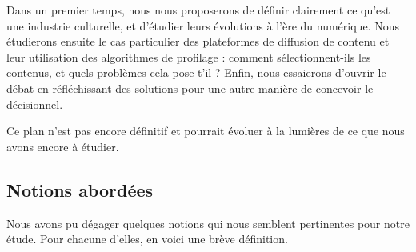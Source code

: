 \documentclass[a4paper,10pt]{article}
\begin{document}
Dans un premier temps, nous nous proposerons de définir clairement ce qu'est une industrie culturelle, et d'étudier leurs évolutions à l'ère du numérique. Nous étudierons ensuite le cas particulier des plateformes de diffusion de contenu et leur utilisation des algorithmes de profilage : comment sélectionnent-ils les contenus, et quels problèmes cela pose-t'il ? Enfin, nous essaierons d'ouvrir le débat en réfléchissant des solutions pour une autre manière de concevoir le décisionnel.

Ce plan n'est pas encore définitif et pourrait évoluer à la lumières de ce que nous avons encore à étudier.

\subsection{Notions abordées}

Nous avons pu dégager quelques notions qui nous semblent pertinentes pour notre étude. Pour chacune d'elles, en voici une brève définition.
\end{document}
